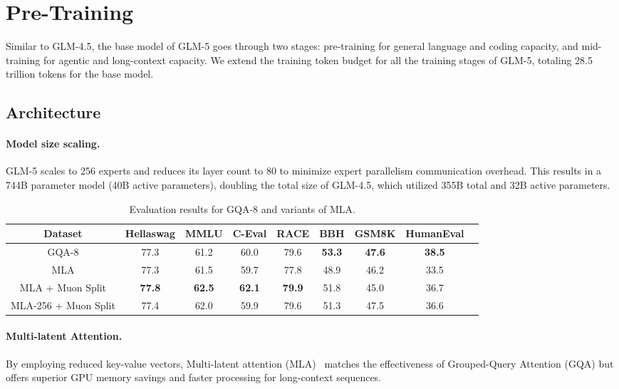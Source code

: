 \section{Pre-Training}
Similar to GLM-4.5, the base model of GLM-5 goes through two stages: pre-training for general language and coding capacity, and mid-training for agentic and long-context capacity. We extend the training token budget for all the training stages of GLM-5, totaling 28.5 trillion tokens for the base model.

\subsection{Architecture}

\paragraph{Model size scaling.} GLM-5 scales to 256 experts and reduces its layer count to 80 to minimize expert parallelism communication overhead. This results in a 744B parameter model (40B active parameters), doubling the total size of GLM-4.5, which utilized 355B total and 32B active parameters.

\begin{table}[!ht]
    \small
    \centering
    \caption{Evaluation results for GQA-8 and variants of MLA.}
    \begin{tabular}{c|cccccccc}
        \toprule
        Dataset & Hellaswag & MMLU & C-Eval & RACE & BBH & GSM8K & HumanEval \\
        \midrule
        GQA-8 & 77.3 & 61.2 & 60.0 & 79.6 & \textbf{53.3} & \textbf{47.6} & \textbf{38.5} \\
        MLA & 77.3 & 61.5 & 59.7 & 77.8 & 48.9 & 46.2 & 33.5 \\
        MLA + Muon Split & \textbf{77.8} & \textbf{62.5} & \textbf{62.1} & \textbf{79.9} & 51.8 & 45.0 & 36.7\\
        MLA-256 + Muon Split & 77.4 & 62.0 & 59.9 & 79.6 & 51.3 & 47.5 & 36.6 \\
        \bottomrule
    \end{tabular}
    \label{tab:mla}
\end{table}

\paragraph{Multi-latent Attention.} By employing reduced key-value vectors, Multi-latent attention (MLA)~\cite{liu2024deepseekv2} matches the effectiveness of Grouped-Query Attention (GQA) but offers superior GPU memory savings and faster processing for long-context sequences.

